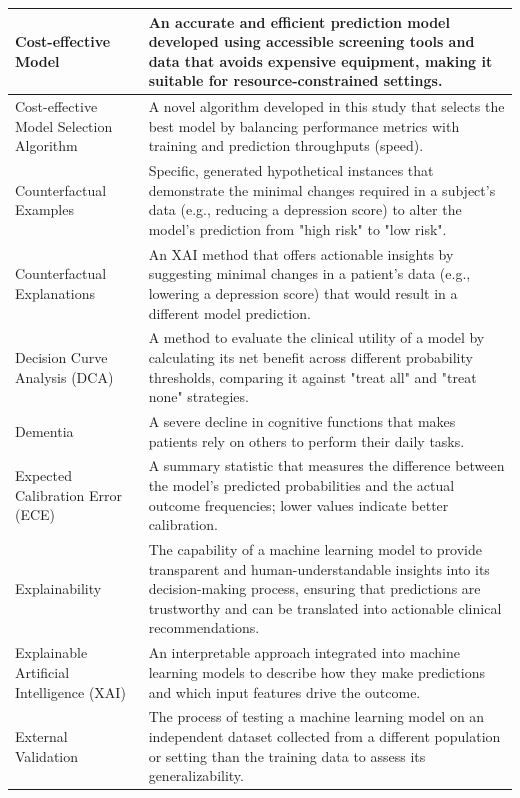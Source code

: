 \begin{longtable}{|M{3cm}|M{9.5cm}|}
        Cost-effective Model & An accurate and efficient prediction model developed using accessible screening tools and data that avoids expensive equipment, making it suitable for resource-constrained settings. \\ \hline
        Cost-effective Model Selection Algorithm & A novel algorithm developed in this study that selects the best model by balancing performance metrics with training and prediction throughputs (speed). \\ \hline
        Counterfactual Examples & Specific, generated hypothetical instances that demonstrate the minimal changes required in a subject's data (e.g., reducing a depression score) to alter the model's prediction from "high risk" to "low risk". \\ \hline
        Counterfactual Explanations & An XAI method that offers actionable insights by suggesting minimal changes in a patient's data (e.g., lowering a depression score) that would result in a different model prediction. \\ \hline
        Decision Curve Analysis (DCA) & A method to evaluate the clinical utility of a model by calculating its net benefit across different probability thresholds, comparing it against "treat all" and "treat none" strategies. \\ \hline
        Dementia & A severe decline in cognitive functions that makes patients rely on others to perform their daily tasks. \\ \hline
        Expected Calibration Error (ECE) & A summary statistic that measures the difference between the model's predicted probabilities and the actual outcome frequencies; lower values indicate better calibration. \\ \hline
        Explainability & The capability of a machine learning model to provide transparent and human-understandable insights into its decision-making process, ensuring that predictions are trustworthy and can be translated into actionable clinical recommendations. \\ \hline
        Explainable Artificial Intelligence (XAI) & An interpretable approach integrated into machine learning models to describe how they make predictions and which input features drive the outcome. \\ \hline
        External Validation & The process of testing a machine learning model on an independent dataset collected from a different population or setting than the training data to assess its generalizability. \\ \hline

\end{longtable}
